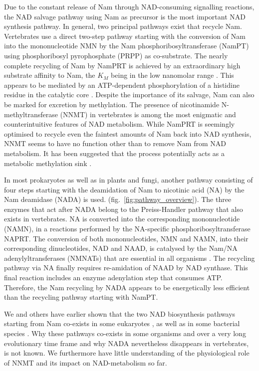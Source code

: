 Due to the constant release of Nam through NAD-consuming signalling reactions, the NAD salvage pathway using Nam as precursor is the most important NAD synthesis pathway. In general, two principal pathways exist that recycle Nam.  Vertebrates use a direct two-step pathway starting with the conversion of Nam into the mononucleotide NMN by the Nam phosphoribosyltransferase (NamPT) using phosphoribosyl pyrophosphate (PRPP) as co-substrate. The nearly complete recycling of Nam by NamPRT is achieved by an extraordinary high substrate affinity to Nam, the $K_{M}$ being in the low nanomolar range \cite{Burgos2008}. This appears to be mediated by an ATP-dependent phosphorylation of a histidine residue in the catalytic core \cite{Burgos2009}. Despite the importance of its salvage, Nam can also be marked for excretion by methylation. The presence of nicotinamide N-methyltransferase (NNMT) in vertebrates \cite{Gossmann2012FEBS} is among the most enigmatic and counterintuitive features of NAD metabolism. While NamPRT is seemingly optimised to recycle even the faintest amounts of Nam back into NAD synthesis, NNMT seems to have no function other than to remove Nam from NAD metabolism. It has been suggested that the process potentially acts as a metabolic methylation sink \cite{Pissios2017}.

In most prokaryotes as well as in plants and fungi, another pathway consisting of four steps starting with the deamidation of Nam to nicotinic acid (NA) by the Nam deamidase (NADA) is used. (fig.~\ref{fig:pathway_overview}). The three enzymes that act after NADA belong to the Preiss-Handler pathway that also exists in vertebrates. NA is converted into the corresponding mononucleotide (NAMN), in a reactions performed by the NA-specific phosphoribosyltransferase NAPRT. The conversion of both mononucleotides, NMN and NAMN, into their corresponding dinucleotides, NAD and NAAD, is catalysed by the Nam/NA adenylyltransferases (NMNATs) that are essential in all organisms \cite{DeFigueiredo2011}. The recycling pathway via NA finally requires re-amidation of NAAD by NAD synthase. This final reaction includes an enzyme adenylation step that consumes ATP. Therefore, the Nam recycling by NADA appears to be energetically less efficient than the recycling pathway starting with NamPT.

We and others have earlier shown that the two NAD biosynthesis pathways starting from Nam co-exists in some eukaryotes \cite{Gossmann2012FEBS,Carneiro2013}, as well as in some bacterial species \cite{Gazzaniga2009}. Why these pathways co-exists in some organisms and over a very long evolutionary time frame and why NADA nevertheless disappears in vertebrates, is not known. We furthermore have little understanding of the physiological role of NNMT and its impact on NAD-metabolism so far.


